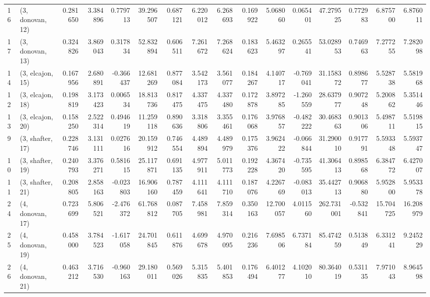 \begin{tabular}{llrrrrrrrrrrrrrr}
16 &  (3, donovan, 12) &   0.281650 &  3.384896 &  0.779713 &  39.296507 &  0.687121 &   6.220012 &  6.268693 &  0.169922 &   5.068060 &  0.065401 &   47.279525 &  0.772983 &   6.875700 &   6.876011 \\
17 &  (3, donovan, 13) &   0.324826 &  3.869043 &  0.317834 &  52.832894 &  0.606511 &   7.261672 &  7.268624 &  0.183623 &   5.463297 &  0.265541 &   53.028953 &  0.746963 &   7.277255 &   7.282098 \\
14 &  (3, elcajon, 15) &   0.167956 &  2.680891 & -0.366437 &  12.681269 &  0.877084 &   3.542173 &  3.561077 &  0.184267 &   4.140717 & -0.769041 &   31.158372 &  0.898677 &   5.528738 &   5.581968 \\
12 &  (3, elcajon, 18) &   0.198819 &  3.173423 &  0.006534 &  18.813736 &  0.817475 &   4.337475 &  4.337480 &  0.172878 &   3.897285 & -1.260559 &   28.637977 &  0.907248 &   5.200862 &   5.351446 \\
13 &  (3, elcajon, 20) &   0.158250 &  2.522314 &  0.494619 &  11.259118 &  0.890636 &   3.318806 &  3.355461 &  0.176068 &   3.976857 & -0.482222 &   30.468363 &  0.901306 &   5.498711 &   5.519815 \\
9  &  (3, shafter, 17) &   0.228746 &  3.131111 &  0.027616 &  20.159912 &  0.746554 &   4.489894 &  4.489979 &  0.175376 &   3.962422 & -0.066844 &   31.290010 &  0.917791 &   5.593348 &   5.593747 \\
10 &  (3, shafter, 19) &   0.240793 &  3.376271 &  0.581615 &  25.117871 &  0.691135 &   4.977911 &  5.011773 &  0.192228 &   4.367420 & -0.735595 &   41.306413 &  0.898568 &   6.384772 &   6.427007 \\
11 &  (3, shafter, 21) &   0.208805 &  2.858163 & -0.023803 &  16.906160 &  0.787459 &   4.111641 &  4.111710 &  0.187076 &   4.226769 & -0.083013 &   35.442713 &  0.906880 &   5.952800 &   5.953378 \\
24 &  (4, donovan, 17) &   0.723699 &  5.806521 & -2.476372 &  61.768812 &  0.087705 &   7.458981 &  7.859314 &  0.350163 &  12.700057 &  4.011560 &  262.731001 & -0.532841 &  15.704725 &  16.208979 \\
25 &  (4, donovan, 19) &   0.458000 &  3.784523 & -1.617058 &  24.701845 &  0.611876 &   4.699678 &  4.970095 &  0.216236 &   7.698506 &  6.737184 &   85.474259 &  0.513849 &   6.331241 &   9.245229 \\
26 &  (4, donovan, 21) &   0.463212 &  3.716530 & -0.960163 &  29.180011 &  0.569026 &   5.315835 &  5.401853 &  0.176494 &   6.401277 &  4.102010 &   80.364019 &  0.531135 &   7.971043 &   8.964598 \\

\end{tabular}
